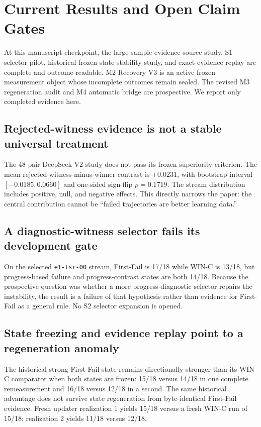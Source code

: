 \section{Current Results and Open Claim Gates}
\label{sec:results}

At this manuscript checkpoint, the large-sample evidence-source study, S1 selector pilot, historical frozen-state stability study, and exact-evidence replay are complete and outcome-readable. M2 Recovery V3 is an active frozen measurement object whose incomplete outcomes remain sealed. The revised M3 regeneration audit and M4 automatic bridge are prospective. We report only completed evidence here.

\subsection{Rejected-witness evidence is not a stable universal treatment}
The 48-pair DeepSeek V2 study does not pass its frozen superiority criterion. The mean rejected-witness-minus-winner contrast is $+0.0231$, with bootstrap interval $[-0.0185,0.0660]$ and one-sided sign-flip $p=0.1719$. The stream distribution includes positive, null, and negative effects. This directly narrows the paper: the central contribution cannot be ``failed trajectories are better learning data.''

\subsection{A diagnostic-witness selector fails its development gate}
On the selected \texttt{e1-tsr-00} stream, First-Fail is 17/18 while WIN-C is 13/18, but progress-based failure and progress-contrast states are both 14/18. Because the prospective question was whether a more progress-diagnostic selector repairs the instability, the result is a failure of that hypothesis rather than evidence for First-Fail as a general rule. No S2 selector expansion is opened.

\subsection{State freezing and evidence replay point to a regeneration anomaly}
The historical strong First-Fail state remains directionally stronger than its WIN-C comparator when both states are frozen: 15/18 versus 14/18 in one complete remeasurement and 16/18 versus 12/18 in a second. The same historical advantage does not survive state regeneration from byte-identical First-Fail evidence. Fresh updater realization 1 yields 15/18 versus a fresh WIN-C run of 15/18; realization 2 yields 11/18 versus 12/18.

